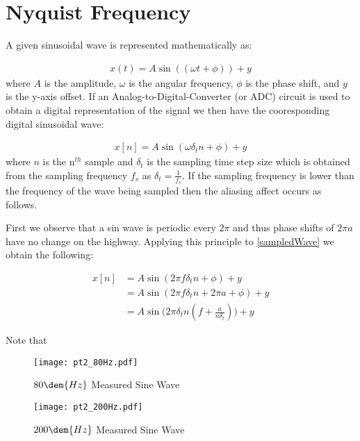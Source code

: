 \documentclass[main.tex]{subfile}
\begin{document}
\section{Nyquist Frequency} 
\label{sec:nyquist_frequency}

A given sinusoidal wave is represented mathematically as:

\begin{align}
  x(t) = A\sin{((\omega t + \phi))} + y
\end{align}
where $A$ is the amplitude, $\omega$ is the angular frequency, $\phi$ is the
phase shift, and $y$ is the y-axis offset. If an Analog-to-Digital-Converter (or
ADC) circuit is used to obtain a digital representation of the signal we then
have the cooresponding digital sinusoidal wave: 

\begin{align}
  x[n] = A\sin{(\omega \delta_{t} n + \phi)} + y \label{eq:sampledWave}
\end{align}
where $n$ is the n$^{th}$ sample and $\delta_{t}$ is the sampling time step size
which is obtained from the sampling frequency $f_s$ as $\delta_{t} =
\frac{1}{f_s}$. If the sampling frequency is lower than the frequency of the
wave being sampled then the aliasing affect occurs as follows.

First we observe that a sin wave is periodic every $2\pi$ and thus phase shifts
of $2\pi a$ have no change on the highway. Applying this principle to \eqref{sampledWave}
we obtain the following:

\begin{align}
  x[n] &= A\sin{(2\pi f \delta_{t} n + \phi)} + y \label{eq:sampledWave}
  \\&= A\sin{(2\pi f \delta_{t} n + 2\pi a + \phi)} + y
  \\&= A\sin{(2\pi \delta_{t} n (f + \frac{a}{n\delta_{t}})}) + y
\end{align}

Note that


\begin{figure}[H]
  \begin{center}
    \texttt{[image: pt2\_80Hz.pdf]}
  \end{center}
  \caption{$80\dem{Hz}$ Measured Sine Wave}
  \label{fig:pt280hz}
\end{figure}

\begin{figure}[H]
  \begin{center}
    \texttt{[image: pt2\_200Hz.pdf]}
  \end{center}
  \caption{$200\dem{Hz}$ Measured Sine Wave}
  \label{fig:pt280hz}
\end{figure}
\end{document}
